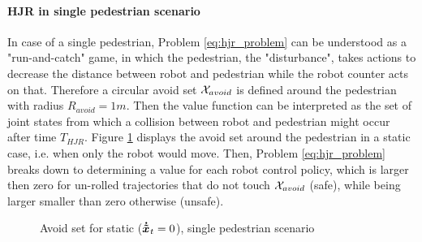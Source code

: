 \paragraph{\ac{HJR} in single pedestrian scenario}
In case of a single pedestrian, Problem \ref{eq:hjr_problem} can be understood as a "run-and-catch" game, in which the pedestrian, the "disturbance", takes actions to decrease the distance between robot and pedestrian while the robot counter acts on that. Therefore a circular avoid set $\mathcal{X}_{avoid}$ is defined around the pedestrian with radius $R_{avoid} = 1m$. Then the value function can be interpreted as the set of joint states from which a collision between robot and pedestrian might occur after time $T_{HJR}$.
\newline
Figure \ref{img:hj_game} displays the avoid set around the pedestrian in a static case, i.e. when only the robot would move. Then, Problem \ref{eq:hjr_problem} breaks down to determining a value for each robot control policy, which is larger then zero for un-rolled trajectories that do not touch $\mathcal{X}_{avoid}$ (safe), while being larger smaller than zero otherwise (unsafe).

\begin{figure}[!ht]
\begin{center}
\end{center}
\caption{Avoid set for static ($\dxped[]_t = 0$), single pedestrian scenario}
\label{img:hj_game}
\end{figure}

